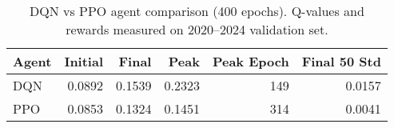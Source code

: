 \begin{table}[t]
  \centering
  \small
  \caption[DQN vs PPO Agent Comparison]{DQN vs PPO agent comparison (400 epochs). Q-values and rewards measured on 2020--2024 validation set.}
  \label{tab:rl_agent_comparison}
  \setlength{\tabcolsep}{4pt}\renewcommand{\arraystretch}{1.12}
  \begin{tabular}{@{} l r r r r r @{} }
    \toprule
    \textbf{Agent} & \textbf{Initial} & \textbf{Final} & \textbf{Peak} & \textbf{Peak Epoch} & \textbf{Final 50 Std} \\
    \midrule
    DQN & 0.0892 & 0.1539 & 0.2323 & 149 & 0.0157 \\
    PPO & 0.0853 & 0.1324 & 0.1451 & 314 & 0.0041 \\
    \bottomrule
  \end{tabular}
\end{table}

